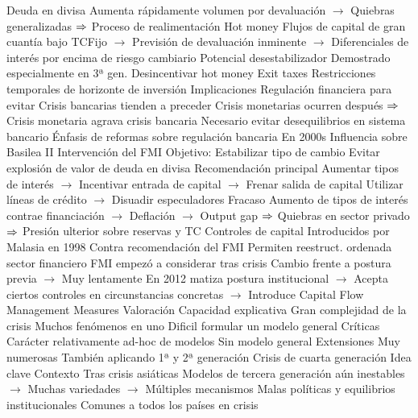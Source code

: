 \documentclass{nuevotema}
\begin{document}
\begin{esquemal}
				\4 Deuda en divisa
				\4[] Aumenta rápidamente volumen por devaluación
				\4[] $\to$ Quiebras generalizadas
				\4[] $\then$ Proceso de realimentación
			\3 Hot money
				\4 Flujos de capital de gran cuantía bajo TCFijo
				\4[] $\to$ Previsión de devaluación inminente
				\4[] $\to$ Diferenciales de interés por encima de riesgo cambiario
				\4 Potencial desestabilizador
				\4[] Demostrado especialmente en 3ª gen.
				\4 Desincentivar hot money
				\4[] Exit taxes
				\4[] Restricciones temporales de horizonte de inversión
		\2 Implicaciones
			\3 Regulación financiera para evitar
				\4 Crisis bancarias tienden a preceder
				\4[] Crisis monetarias ocurren después
				\4[] $\then$ Crisis monetaria agrava crisis bancaria
				\4[$\then$] Necesario evitar desequilibrios en sistema bancario
				\4 Énfasis de reformas sobre regulación bancaria
				\4[] En 2000s
				\4 Influencia sobre Basilea II
			\3 Intervención del FMI
				\4 Objetivo:
				\4[] Estabilizar tipo de cambio
				\4[] Evitar explosión de valor de deuda en divisa
				\4 Recomendación principal
				\4[] Aumentar tipos de interés
				\4[] $\to$ Incentivar entrada de capital
				\4[] $\to$ Frenar salida de capital
				\4[] Utilizar líneas de crédito
				\4[] $\to$ Disuadir especuladores
				\4 Fracaso
				\4[] Aumento de tipos de interés contrae financiación
				\4[] $\to$ Deflación
				\4[] $\to$ Output gap
				\4[] $\then$ Quiebras en sector privado
				\4[] $\then$ Presión ulterior sobre reservas y TC
			\3 Controles de capital
				\4 Introducidos por Malasia en 1998
				\4[] Contra recomendación del FMI
				\4 Permiten reestruct. ordenada sector financiero
				\4 FMI empezó a considerar tras crisis
				\4[] Cambio frente a postura previa
				\4[] $\to$ Muy lentamente
				\4[] En 2012 matiza postura institucional
				\4[] $\to$ Acepta ciertos controles en circunstancias concretas
				\4[] $\to$ Introduce Capital Flow Management Measures
		\2 Valoración
			\3 Capacidad explicativa
				\4 Gran complejidad de la crisis
				\4[] Muchos fenómenos en uno
				\4 Dificil formular un modelo general
			\3 Críticas
				\4 Carácter relativamente ad-hoc de modelos
				\4 Sin modelo general
			\3 Extensiones
				\4 Muy numerosas
				\4 También aplicando 1ª y 2ª generación
	\1 
		\2 Crisis de cuarta generación
			\3 Idea clave
				\4 Contexto
				\4[] Tras crisis asiáticas
				\4[] Modelos de tercera generación aún inestables
				\4[] $\to$ Muchas variedades
				\4[] $\to$ Múltiples mecanismos
				\4 Malas políticas y equilibrios institucionales
				\4[] Comunes a todos los países en crisis

\end{esquemal}
\end{document}
